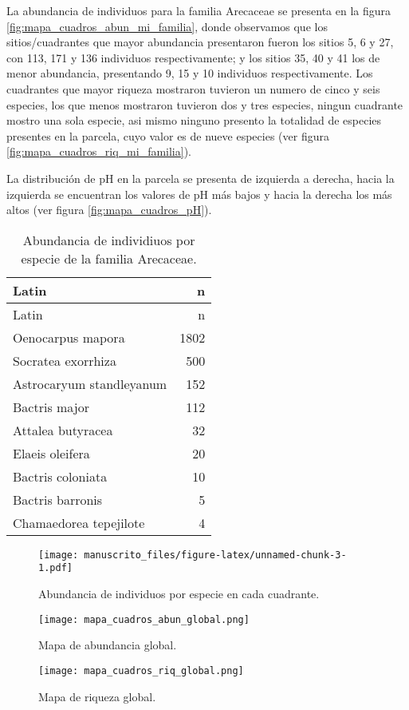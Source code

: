 \documentclass[11pt,]{article}
\begin{document}
La abundancia de individuos para la familia Arecaceae se presenta en la
figura \ref{fig:mapa_cuadros_abun_mi_familia}, donde observamos que los
sitios/cuadrantes que mayor abundancia presentaron fueron los sitios 5,
6 y 27, con 113, 171 y 136 individuos respectivamente; y los sitios 35,
40 y 41 los de menor abundancia, presentando 9, 15 y 10 individuos
respectivamente. Los cuadrantes que mayor riqueza mostraron tuvieron un
numero de cinco y seis especies, los que menos mostraron tuvieron dos y
tres especies, ningun cuadrante mostro una sola especie, asi mismo
ninguno presento la totalidad de especies presentes en la parcela, cuyo
valor es de nueve especies (ver figura
\ref{fig:mapa_cuadros_riq_mi_familia}).

La distribución de pH en la parcela se presenta de izquierda a derecha,
hacia la izquierda se encuentran los valores de pH más bajos y hacia la
derecha los más altos (ver figura \ref{fig:mapa_cuadros_pH}).

\begin{longtable}[]{@{}lr@{}}
\caption{\label{tab:abun_sp}Abundancia de individiuos por especie de la
familia Arecaceae.}\tabularnewline
\toprule
Latin & n\tabularnewline
\midrule
\endfirsthead
\toprule
Latin & n\tabularnewline
\midrule
\endhead
Oenocarpus mapora & 1802\tabularnewline
Socratea exorrhiza & 500\tabularnewline
Astrocaryum standleyanum & 152\tabularnewline
Bactris major & 112\tabularnewline
Attalea butyracea & 32\tabularnewline
Elaeis oleifera & 20\tabularnewline
Bactris coloniata & 10\tabularnewline
Bactris barronis & 5\tabularnewline
Chamaedorea tepejilote & 4\tabularnewline
\bottomrule
\end{longtable}

\begin{figure}
\centering
\texttt{[image: manuscrito\_files/figure-latex/unnamed-chunk-3-1.pdf]}
\caption{\label{fig:abun_sp_q}Abundancia de individuos por especie en
cada cuadrante.}
\end{figure}

\begin{figure}
\centering
\texttt{[image: mapa\_cuadros\_abun\_global.png]}
\caption{Mapa de abundancia global.
\label{fig:mapa_cuadros_abun_global}}
\end{figure}

\begin{figure}
\centering
\texttt{[image: mapa\_cuadros\_riq\_global.png]}
\caption{Mapa de riqueza global. \label{fig:mapa_cuadros_riq_global}}
\end{figure}
\end{document}
